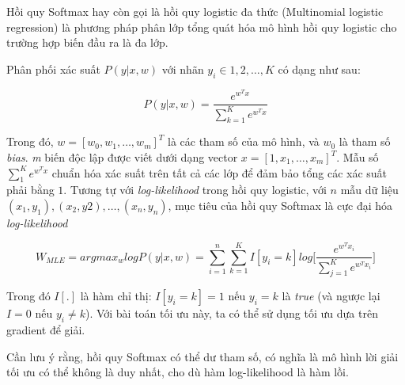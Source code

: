 Hồi quy Softmax hay còn gọi là hồi quy logistic đa thức (Multinomial logistic regression) là phương pháp phân lớp tổng quát hóa mô hình hồi quy logistic cho trường hợp biến đầu ra là đa lớp.


Phân phối xác suất $P(y|x,w)$ với nhãn $y_i \in {1, 2, \dots, K}$ có dạng như sau:

\begin{equation*}
    P(y|x,w) = \frac{e^{w^Tx}}{\sum^K_{k=1}e^{w^Tx}}
\end{equation*}

Trong đó, $w = [w_0, w_1,\dots,w_m]^T$ là các tham số của mô hình, và $w_0$ là tham số \emph{bias}. \emph{m} biến độc lập được viết dưới dạng vector $x = [1,x_1,\dots,x_m]^T$. Mẫu số $\sum^K_1e^{w^Tx}$ chuẩn hóa xác suất trên tất cả các lớp để đảm bảo tổng các xác suất phải bằng $1$.
Tương tự với \emph{log-likelihood} trong hồi quy logistic, với $n$ mẫu dữ liệu $(x_1, y_1), (x_2, y2),\dots,(x_n, y_n)$, mục tiêu của hồi quy Softmax là cực đại hóa \emph{log-likelihood}

\begin{equation*}
    W_{MLE} = argmax_{w}logP(y|x,w) = {\sum^n_{i=1}\sum^K_{k=1}I[y_i=k]log\Bigg[\frac{e^{w^Tx_i}}{\sum^K_{j=1}e^{w^Tx_i}}\Bigg]}
\end{equation*}

Trong đó $I[.]$ là hàm chỉ thị: $I[y_i = k] = 1$ nếu $y_i =k$ là \emph{true} (và ngược lại $I=0$ nếu $y_i \neq k$). Với bài toán tối ưu này, ta có thể sử dụng tối ưu dựa trên gradient để giải.

Cần lưu ý rằng, hồi quy Softmax có thể dư tham số, có nghĩa là mô hình lời giải tối ưu có thể không là duy nhất, cho dù hàm log-likelihood là hàm lồi.



